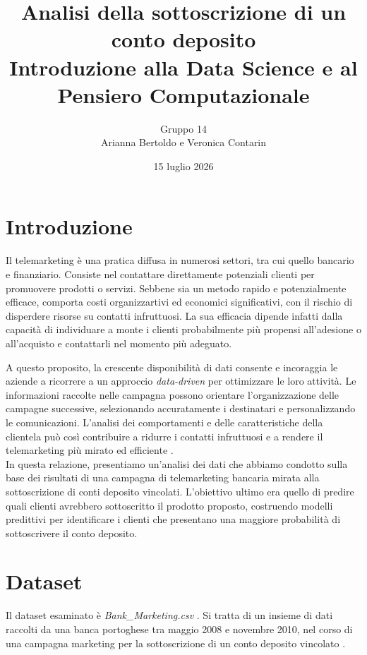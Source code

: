 \documentclass[11,5pt, a4paper]{article}
\title{\Large Analisi della sottoscrizione di un conto deposito \\[0.5em] \large Introduzione alla Data Science e al Pensiero Computazionale}
\author{\large Gruppo 14 \\[0.33em] Arianna Bertoldo e Veronica Contarin}
\date{15 luglio 2026}
\begin{document}
\maketitle

\tableofcontents %

\section{Introduzione}
Il telemarketing è una pratica diffusa in numerosi settori, tra cui quello bancario e finanziario. Consiste nel contattare direttamente potenziali clienti per promuovere prodotti o servizi. 
Sebbene sia un metodo rapido e potenzialmente efficace, comporta costi organizzartivi ed economici significativi, con il rischio di disperdere risorse su contatti infruttuosi. La sua efficacia dipende infatti dalla capacità di individuare a monte i clienti probabilmente più propensi all'adesione o all'acquisto e contattarli nel momento più adeguato.

A questo proposito, la crescente disponibilità di dati consente e incoraggia le aziende a ricorrere a un approccio \textit{data-driven} per ottimizzare le loro attività.
Le informazioni raccolte nelle campagna possono orientare l'organizzazione delle campagne successive, selezionando accuratamente i destinatari e personalizzando le comunicazioni. L'analisi dei comportamenti e delle caratteristiche della clientela può così contribuire a ridurre i contatti infruttuosi e a rendere il telemarketing più mirato ed efficiente \citep{ROSARIO2023}.
\\

In questa relazione, presentiamo un'analisi dei dati \citep{ariannab02}
che abbiamo condotto sulla base dei risultati di una campagna di telemarketing bancaria mirata alla sottoscrizione di conti deposito vincolati.  L'obiettivo ultimo era quello di predire quali clienti avrebbero sottoscritto il prodotto proposto, costruendo modelli predittivi per identificare i clienti che presentano una maggiore probabilità di sottoscrivere il conto deposito. 


\section{Dataset}

Il dataset esaminato è \textit{Bank\_Marketing.csv} \citep{BankMarketing}.
Si tratta di un insieme di dati raccolti da una banca portoghese tra maggio 2008 e novembre 2010, nel corso di una campagna marketing per la sottoscrizione di un conto deposito vincolato \citep{bank_marketing_222}.
\end{document}
